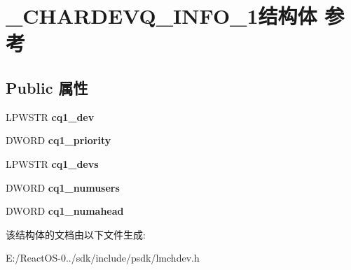 \hypertarget{struct___c_h_a_r_d_e_v_q___i_n_f_o__1}{}\section{\+\_\+\+C\+H\+A\+R\+D\+E\+V\+Q\+\_\+\+I\+N\+F\+O\+\_\+1结构体 参考}
\label{struct___c_h_a_r_d_e_v_q___i_n_f_o__1}
\subsection*{Public 属性}
\begin{DoxyCompactItemize}
\item 
\mbox{\label{struct___c_h_a_r_d_e_v_q___i_n_f_o__1_a10e7331dd2e4c73c78ac5223cab52e07}} 
L\+P\+W\+S\+TR {\bfseries cq1\+\_\+dev}
\item 
\mbox{\label{struct___c_h_a_r_d_e_v_q___i_n_f_o__1_a50d78356f1fd7d863476f3aad266708d}} 
D\+W\+O\+RD {\bfseries cq1\+\_\+priority}
\item 
\mbox{\label{struct___c_h_a_r_d_e_v_q___i_n_f_o__1_a1de3d15b380ea607196c5c0849ad24b2}} 
L\+P\+W\+S\+TR {\bfseries cq1\+\_\+devs}
\item 
\mbox{\label{struct___c_h_a_r_d_e_v_q___i_n_f_o__1_aae65b849ee4f6ed87ab9c4704faca165}} 
D\+W\+O\+RD {\bfseries cq1\+\_\+numusers}
\item 
\mbox{\label{struct___c_h_a_r_d_e_v_q___i_n_f_o__1_abeb80abe7c89106f5b5984a12a5cb26a}} 
D\+W\+O\+RD {\bfseries cq1\+\_\+numahead}
\end{DoxyCompactItemize}


该结构体的文档由以下文件生成\+:\begin{DoxyCompactItemize}
\item 
E\+:/\+React\+O\+S-\/0../sdk/include/psdk/lmchdev.\+h\end{DoxyCompactItemize}
